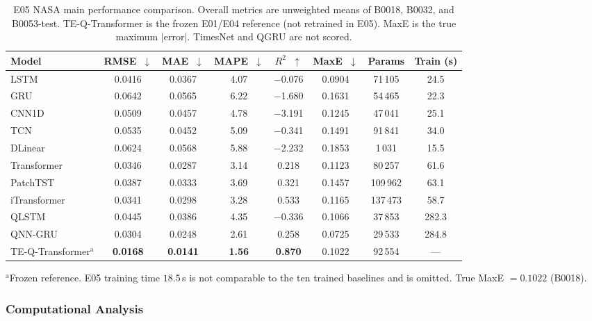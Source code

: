 \begin{table}[t]
\centering
\caption{E05 NASA main performance comparison. Overall metrics are unweighted means of B0018, B0032, and B0053-test. TE-Q-Transformer is the frozen E01/E04 reference (not retrained in E05). MaxE is the true maximum $|$error$|$. TimesNet and QGRU are not scored.}\label{tab:main_benchmark}
\footnotesize
\begin{tabular}{@{}lccccccc@{}}
\toprule
Model & RMSE~$\downarrow$ & MAE~$\downarrow$ & MAPE~$\downarrow$ & $R^2$~$\uparrow$ & MaxE~$\downarrow$ & Params & Train (s) \\
\midrule
LSTM & 0.0416 & 0.0367 & 4.07 & $-$0.076 & 0.0904 & 71\,105 & 24.5 \\
GRU & 0.0642 & 0.0565 & 6.22 & $-$1.680 & 0.1631 & 54\,465 & 22.3 \\
CNN1D & 0.0509 & 0.0457 & 4.78 & $-$3.191 & 0.1245 & 47\,041 & 25.1 \\
TCN & 0.0535 & 0.0452 & 5.09 & $-$0.341 & 0.1491 & 91\,841 & 34.0 \\
DLinear & 0.0624 & 0.0568 & 5.88 & $-$2.232 & 0.1853 & 1\,031 & 15.5 \\
Transformer & 0.0346 & 0.0287 & 3.14 & 0.218 & 0.1123 & 80\,257 & 61.6 \\
PatchTST & 0.0387 & 0.0333 & 3.69 & 0.321 & 0.1457 & 109\,962 & 63.1 \\
iTransformer & 0.0341 & 0.0298 & 3.28 & 0.533 & 0.1165 & 137\,473 & 58.7 \\
QLSTM & 0.0445 & 0.0386 & 4.35 & $-$0.336 & 0.1066 & 37\,853 & 282.3 \\
QNN-GRU & 0.0304 & 0.0248 & 2.61 & 0.258 & 0.0725 & 29\,533 & 284.8 \\
TE-Q-Transformer$^{\mathrm{a}}$ & \textbf{0.0168} & \textbf{0.0141} & \textbf{1.56} & \textbf{0.870} & 0.1022 & 92\,554 & --- \\
\bottomrule
\end{tabular}
\vspace{2pt}
\begin{minipage}{\textwidth}
\footnotesize $^{\mathrm{a}}$Frozen reference. E05 training time $18.5$\,s is not comparable to the ten trained baselines and is omitted. True MaxE $=0.1022$ (B0018).
\end{minipage}
\end{table}

\subsubsection{Computational Analysis}
\label{sec:computational_analysis}

